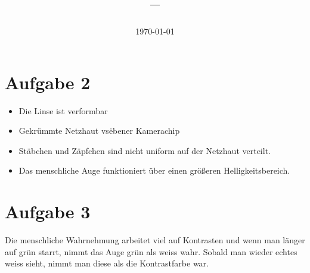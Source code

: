 \documentclass[11pt,a4paper]{article}
\title{\Veranstaltung{} -- \Nummer{} \Uebung{} }
\author{\Tutanden}
\date{\today}
\begin{document}
\maketitle
\thispagestyle{fancy}

\section{Aufgabe 2}

\begin{itemize}
\item Die Linse ist verformbar
\item Gekrümmte Netzhaut vs\. ebener Kamerachip
\item Stäbchen und Zäpfchen sind nicht uniform auf der Netzhaut verteilt.
\item Das menschliche Auge funktioniert über einen größeren Helligkeitsbereich.
\end{itemize}

\section{Aufgabe 3}
Die menschliche Wahrnehmung arbeitet viel auf Kontrasten und wenn man länger
auf grün starrt, nimmt das Auge grün als weiss wahr. Sobald man wieder echtes weiss sieht,
nimmt man diese als die Kontrastfarbe war.
\end{document}
